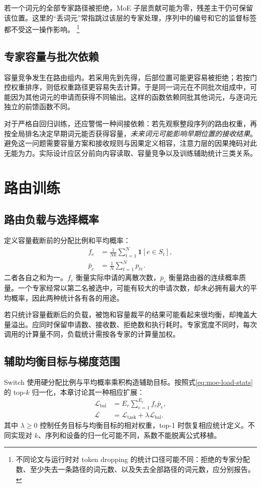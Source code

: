 \documentclass[../textbook.tex]{subfiles}
\begin{document}
若一个词元的全部专家路径被拒绝，MoE 子层贡献可能为零，残差主干仍可保留该位置。这里的“丢词元”常指跳过该层的专家处理，序列中的编号和它的监督标签都不受这一操作影响。
\footnote{不同论文与运行时对 token dropping 的统计口径可能不同：拒绝的专家分配数、至少失去一条路径的词元数、以及失去全部路径的词元数，应分别报告。}

\subsection{专家容量与批次依赖}
容量竞争发生在路由组内。若采用先到先得，后部位置可能更容易被拒绝；若按门控权重排序，则低权重路径更容易失去计算。于是同一词元在不同批次组成中，可能因为其他词元的申请而获得不同输出。这样的函数依赖同批其他词元，与逐词元独立的前馈函数不同。

对于严格自回归训练，还应警惕一种间接依赖：若先观察整段序列的路由权重，再按全局排名决定早期词元能否获得容量，\emph{未来词元可能影响早期位置的接收结果}。避免这一问题需要容量方案和接收规则与因果定义相容，注意力层的因果掩码对此无能为力。实际设计应区分前向内容读取、容量竞争以及训练辅助统计三类关系。

\section{路由训练}

\subsection{路由负载与选择概率}
定义容量截断前的分配比例和平均概率：
\begin{equation}\label{eq:moe-load-stats}
\begin{aligned}
 f_e &= \frac1{Nk}\sum_{t=1}^{N}\mathbf1[e\in S_t], \\
 \bar p_e &= \frac1N\sum_{t=1}^{N}p_{te}.
\end{aligned}
\end{equation}
二者各自之和为一。$f_e$ 衡量实际申请的离散次数，$\bar p_e$ 衡量路由器的连续概率质量。一个专家经常以第二名被选中，可能有较大的申请次数，却未必拥有最大的平均概率，因此两种统计各有各的用途。

若只统计容量截断后的负载，被饱和容量裁平的结果可能看起来很均衡，却掩盖大量溢出。应同时保留申请数、接收数、拒绝数和执行耗时。专家宽度不同时，每次调用的计算量不同，负载统计需按各专家的计算量加权。

\subsection{辅助均衡目标与梯度范围}
Switch 使用硬分配比例与平均概率乘积构造辅助目标。按照式\eqref{eq:moe-load-stats}的 top-$k$ 归一化，本章讨论其一种相应扩展：
\begin{equation}\label{eq:moe-loadloss}
\begin{aligned}
 \mathcal L_{\mathrm{bal}} &= E_r\sum_{e=1}^{E_r}f_e\bar p_e, \\
 \mathcal L &= \mathcal L_{\mathrm{task}}+\lambda\mathcal L_{\mathrm{bal}}.
\end{aligned}
\end{equation}
其中 $\lambda\ge0$ 控制任务目标与均衡目标的相对权重，top-1 时恢复相应统计定义。不同实现对 $k$、序列和设备的归一化可能不同，系数不能脱离公式移植。
\end{document}
